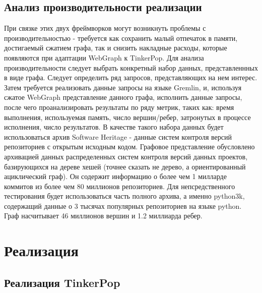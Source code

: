\documentclass[times,specification,annotation]{itmo-student-thesis}
\begin{document}
\section{Анализ производительности реализации}

При связке этих двух фреймворков могут возникнуть проблемы с производительностью - требуется как сохранить малый отпечаток в памяти, достигаемый сжатием графа, так и снизить накладные расходы, которые появляются при адаптации WebGraph к TinkerPop.
Для анализа производительности следует выбрать конкретный набор данных, представленнных в виде графа. Следует определить ряд запросов, представляющих на нем интерес. Затем требуется реализовать данные запросы на языке Gremlin, и, используя сжатое WebGraph представление данного графа, исполнить данные запросы, после чего проанализировать результаты по ряду метрик, таких как: время выполнения, используемая память, число вершин/ребер, затронутых в процессе исполнения, число результатов.
В качестве такого набора данных будет использоваться архив Software Heritage - данные систем контроля версий репозиториев с открытым исходным кодом. Графовое представление обусловлено архивацией данных распределенных систем контроля версий данных проектов, базирующихся на дереве хешей (точнее сказать не дерево, а ориентированный ациклический граф). Он содержит информацию о более чем 1 милларде коммитов из более чем 80 миллионов репозиториев. Для непсредственного тестирования будет использоваться часть полного архива, а именно python3k, содержащий данные о 3 тысячах популярных репозиториев на языке python. Граф насчитывает 46 миллионов вершин и 1.2 миллиарда ребер.

\chapter{Реализация}

\section{Реализация TinkerPop}
\end{document}
